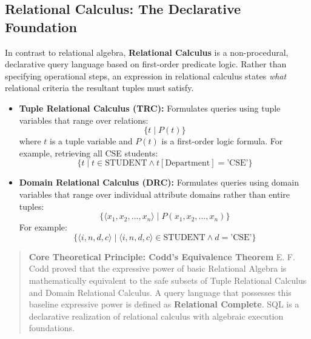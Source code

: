 \subsection{Relational Calculus: The Declarative Foundation}
In contrast to relational algebra, \textbf{Relational Calculus} is a non-procedural, declarative query language based on first-order predicate logic. Rather than specifying operational steps, an expression in relational calculus states \textit{what} relational criteria the resultant tuples must satisfy.
\begin{itemize}
    \item \textbf{Tuple Relational Calculus (TRC):} Formulates queries using tuple variables that range over relations:
    \begin{equation}
    \{t \mid P(t)\}
    \end{equation}
    where $t$ is a tuple variable and $P(t)$ is a first-order logic formula. For example, retrieving all CSE students:
    \begin{equation}
    \{t \mid t \in \text{STUDENT} \land t[\text{Department}] = \text{'CSE'}\}
    \end{equation}
    \item \textbf{Domain Relational Calculus (DRC):} Formulates queries using domain variables that range over individual attribute domains rather than entire tuples:
    \begin{equation}
    \{\langle x_1, x_2, \dots, x_n \rangle \mid P(x_1, x_2, \dots, x_n)\}
    \end{equation}
    For example:
    \begin{equation}
    \{\langle i, n, d, c \rangle \mid \langle i, n, d, c \rangle \in \text{STUDENT} \land d = \text{'CSE'}\}
    \end{equation}
\end{itemize}

\begin{quote}
\textbf{Core Theoretical Principle: Codd's Equivalence Theorem}
E. F. Codd proved that the expressive power of basic Relational Algebra is mathematically equivalent to the safe subsets of Tuple Relational Calculus and Domain Relational Calculus. A query language that possesses this baseline expressive power is defined as \textbf{Relational Complete}. SQL is a declarative realization of relational calculus with algebraic execution foundations.
\end{quote}

